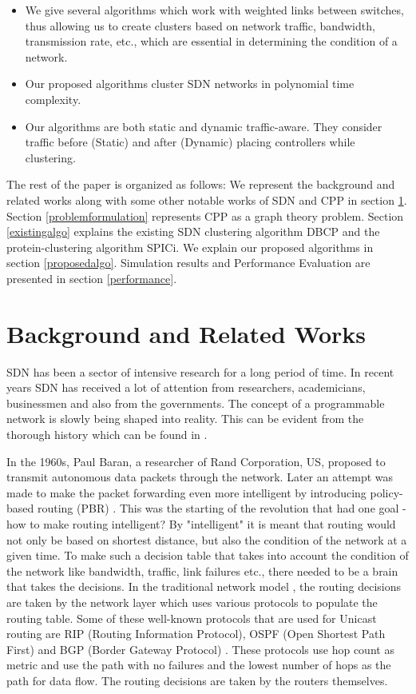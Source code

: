 \documentclass[times]{dacauth}
\begin{document}
\begin{itemize}
	\item We give several algorithms which work with weighted links between switches, thus allowing us to create clusters based on network traffic, bandwidth, transmission rate, etc., which are essential in determining the condition of a network.
	\item Our proposed algorithms cluster SDN networks in polynomial time complexity.
	\item Our algorithms are both static and dynamic traffic-aware. They consider traffic before (Static) and after (Dynamic) placing controllers while clustering. 
\end{itemize}

The rest of the paper is organized as follows: We represent the background and related works along with some other notable works of SDN and CPP in section \ref{relatedworks}. Section \ref{problemformulation} represents CPP as a graph theory problem. Section \ref{existingalgo} explains the existing SDN clustering algorithm DBCP and the protein-clustering algorithm SPICi. We explain our proposed algorithms in section \ref{proposedalgo}. Simulation results and Performance Evaluation are presented in section \ref{performance}.

\section{Background and Related Works} \label{relatedworks}
SDN has been a sector of intensive research for a long period of time. In recent years SDN has received a lot of attention from researchers, academicians, businessmen and also from the governments. The concept of a programmable network is slowly being shaped into reality. This can be evident from the thorough history which can be found in \cite{sdnrao2014,sdnsurvey2015,sdnsurvey2017}.

In the 1960s, Paul Baran, a researcher of Rand Corporation, US, proposed to transmit autonomous data packets \cite{goransson2014software1} through the network. Later an attempt was made to make the packet forwarding even more intelligent by introducing policy-based routing (PBR) \cite{goransson2014software2}. This was the starting of the revolution that had one goal - how to make routing intelligent? By "intelligent" it is meant that routing would not only be based on shortest distance, but also the condition of the network at a given time.
To make such a decision table that takes into account the condition of the network like bandwidth, traffic, link failures etc., there needed to be a brain that takes the decisions. In the traditional network model \cite{forouzan2006data}, the routing decisions are taken by the network layer which uses various protocols to populate the routing table. Some of these well-known protocols that are used for Unicast routing are RIP (Routing Information Protocol), OSPF (Open Shortest Path First) and BGP (Border Gateway Protocol) \cite{forouzan2002tcp}. These protocols use hop count as metric and use the path with no failures and the lowest number of hops as the path for data flow. The routing decisions are taken by the routers themselves.
\end{document}
